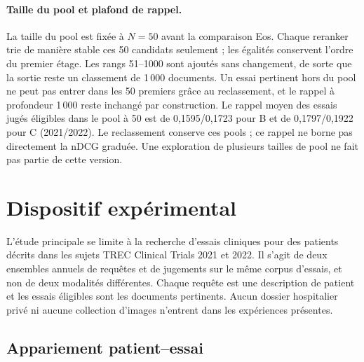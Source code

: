 \documentclass{article}
\begin{document}
\paragraph{Taille du pool et plafond de rappel.} La taille du pool est fixée à $N=50$ avant la comparaison Eos. Chaque reranker trie de manière stable ces 50 candidats seulement ; les égalités conservent l'ordre du premier étage. Les rangs 51--1000 sont ajoutés sans changement, de sorte que la sortie reste un classement de 1\,000 documents. Un essai pertinent hors du pool ne peut pas entrer dans les 50 premiers grâce au reclassement, et le rappel à profondeur 1\,000 reste inchangé par construction. Le rappel moyen des essais jugés éligibles dans le pool à 50 est de 0,1595/0,1723 pour B et de 0,1797/0,1922 pour C (2021/2022). Le reclassement conserve ces pools ; ce rappel ne borne pas directement la nDCG graduée. Une exploration de plusieurs tailles de pool ne fait pas partie de cette version.

\section{Dispositif expérimental}
\label{sec:setup}

L'étude principale se limite à la recherche d'essais cliniques pour des patients décrits dans les sujets TREC Clinical Trials 2021 et 2022. Il s'agit de deux ensembles annuels de requêtes et de jugements sur le même corpus d'essais, et non de deux modalités différentes. Chaque requête est une description de patient et les essais éligibles sont les documents pertinents. Aucun dossier hospitalier privé ni aucune collection d'images n'entrent dans les expériences présentes.

\subsection{Appariement patient--essai}
\end{document}
